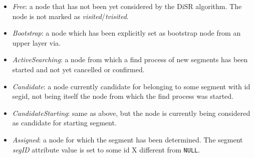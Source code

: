 \begin{itemize}
\item{\emph{Free}}: a node that has  not been yet considered  by the DiSR algorithm.
The node is not marked as \emph{visited}/\emph{tvisited}.
\item{\emph{Bootstrap}}: a node which has been explicitly set as bootstrap node from
an upper layer via. 

\item{\emph{ActiveSearching}}: a node from which a find process of new segments has
been started and not yet cancelled or confirmed. 
\item{\emph{Candidate}}: a node currently candidate for belonging to some segment
with id segid, not being itself the node from which the find process
was started. 

\item{\emph{CandidateStarting}}: same as above, but the node is currently being considered as candidate
for starting segment. 

\item{\emph{Assigned}}: a node for which the segment has been determined.  The
segment \emph{segID} attribute value is set to some id X different from \texttt{NULL}.
\end{itemize}


